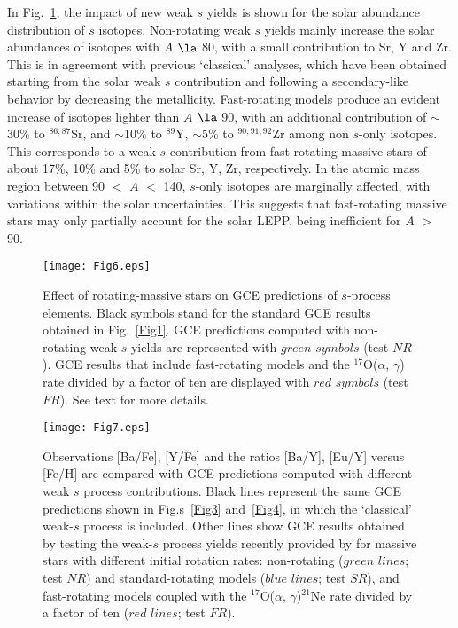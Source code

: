 \documentclass[manuscript]{aastex}
\begin{document}
In Fig.~\ref{Fig6}, the impact of new weak $s$ yields is shown for the solar abundance 
distribution of $s$ isotopes.
Non-rotating weak $s$ yields mainly increase the solar abundances of isotopes with $A$ $\la$ 80, 
with a small contribution to Sr, Y and Zr. This is in agreement with previous `classical' analyses, 
which have been obtained starting from the solar weak $s$ contribution and following a 
secondary-like behavior by decreasing the metallicity.
Fast-rotating models produce an evident increase of isotopes lighter than $A$ $\la$ 90, 
with an additional contribution of $\sim$30\% to $^{86,87}$Sr, and $\sim$10\% to $^{89}$Y, $\sim$5\%
to $^{90,91,92}$Zr among non $s$-only isotopes. This corresponds to a weak $s$ contribution 
from fast-rotating massive stars of about 17\%, 10\% and 5\% to solar Sr, Y, Zr, respectively.
In the atomic mass region between 90 $<$ $A$ $<$ 140, $s$-only isotopes are marginally 
affected, with variations within the solar uncertainties. This suggests that fast-rotating 
massive stars may only partially account for the solar LEPP, being inefficient for $A$ $>$ 90.

\begin{figure} 
\texttt{[image: Fig6.eps]}  
\caption{\label{Fig6} Effect of rotating-massive stars on GCE predictions of $s$-process
elements. Black symbols stand for the standard GCE results obtained 
in Fig.~\ref{Fig1}. GCE predictions computed with non-rotating weak $s$ yields
are represented with $green$ $symbols$ (test $NR$). GCE results that include 
fast-rotating models and the $^{17}$O($\alpha$, $\gamma$) rate divided by a 
factor of ten are displayed with $red$ $symbols$ (test $FR$). 
See text for more details.} 
\end{figure}


\begin{figure} 
\vspace{-15mm}
\texttt{[image: Fig7.eps]}  
\vspace{-70mm}
\caption{\label{Fig7} Observations [Ba/Fe], [Y/Fe] and the ratios [Ba/Y], [Eu/Y]
versus [Fe/H] are compared with GCE predictions computed with different weak $s$
process contributions.
Black lines represent the same GCE predictions shown in Fig.s~\ref{Fig3} and~\ref{Fig4}, 
in which the `classical' weak-$s$ process is included.
Other lines show GCE results obtained by testing the weak-$s$ process 
yields recently provided by \citet{fris16} for massive stars with different
initial rotation rates: non-rotating ($green$ $lines$; test $NR$) and standard-rotating models 
($blue$ $lines$; test $SR$), and fast-rotating models coupled with the $^{17}$O($\alpha$, 
$\gamma$)$^{21}$Ne rate divided by a factor of ten ($red$ $lines$; test $FR$). }
\end{figure}
\end{document}
